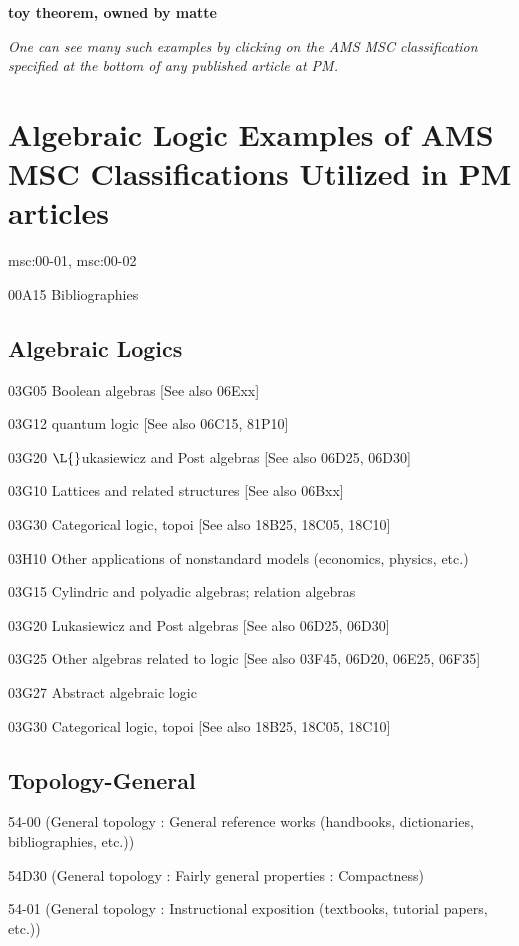 \documentclass[12pt]{article}
\theoremstyle{plain}
\theoremstyle{definition}
\numberwithin{equation}{section}
\begin{document}
{\bf{ toy theorem}, owned by matte


{\em One can see many such examples by clicking on the AMS MSC classification specified at the bottom of any published article at PM.} 




\section{Algebraic Logic Examples of AMS MSC Classifications Utilized in PM articles}

msc:00-01, msc:00-02

00A15 Bibliographies


\subsection{Algebraic Logics}

03G05 Boolean algebras [See also 06Exx]

03G12 quantum logic [See also 06C15, 81P10]

03G20 $\L{}$ukasiewicz and Post algebras [See also 06D25, 06D30]

03G10 Lattices and related structures [See also 06Bxx]

03G30 Categorical logic, topoi [See also 18B25, 18C05, 18C10]

03H10 Other applications of nonstandard models (economics, physics, etc.)

03G15 Cylindric and polyadic algebras; relation algebras

03G20 Lukasiewicz and Post algebras [See also 06D25, 06D30]

03G25 Other algebras related to logic [See also 03F45, 06D20, 06E25, 06F35]

03G27 Abstract algebraic logic

03G30 Categorical logic, topoi [See also 18B25, 18C05, 18C10]

\subsection{Topology-General}

54-00 (General topology : General reference works (handbooks, dictionaries, bibliographies, etc.))

54D30 (General topology : Fairly general properties : Compactness)

54-01 (General topology : Instructional exposition (textbooks, tutorial papers, etc.))

}
\end{document}
